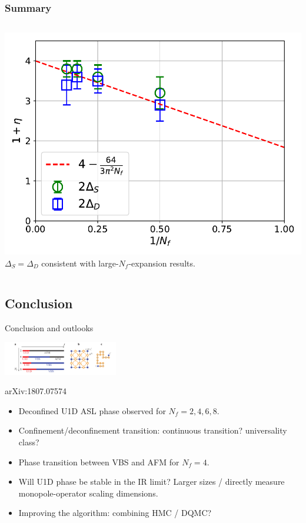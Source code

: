 \documentclass[xcolor=table, 10pt, aspectratio=43]{beamer}
\begin{document}
\begin{frame}
  \frametitle{Summary}
  \begin{columns}
    \includegraphics[width=\textwidth]{../u1sl/eta}
		$\Delta_S=\Delta_D$ consistent with large-$N_f$-expansion results.
  \end{columns}
\end{frame}

\subsection{Conclusion}

\begin{frame}{Conclusion and outlooks}
  \begin{center}
    \includegraphics[width=5cm]{../u1sl/phase-diagram}

		{\small arXiv:1807.07574}
  \end{center}
  \begin{itemize}
    \item Deconfined U1D ASL phase observed for $N_f=2,4,6,8$.
    \item Confinement/deconfinement transition: continuous transition? universality class?
    \item Phase transition between VBS and AFM for $N_f=4$.
    \item Will U1D phase be stable in the IR limit? Larger sizes / directly measure monopole-operator scaling dimensions.
    \item Improving the algorithm: combining HMC / DQMC?
  \end{itemize}
\end{frame}
\end{document}
